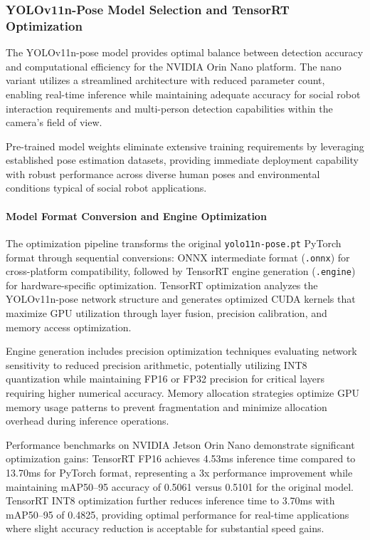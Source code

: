 \subsubsection{YOLOv11n-Pose Model Selection and TensorRT Optimization}

The YOLOv11n-pose model provides optimal balance between detection accuracy and computational efficiency for the NVIDIA Orin Nano platform. The nano variant utilizes a streamlined architecture with reduced parameter count, enabling real-time inference while maintaining adequate accuracy for social robot interaction requirements and multi-person detection capabilities within the camera's field of view.

Pre-trained model weights eliminate extensive training requirements by leveraging established pose estimation datasets, providing immediate deployment capability with robust performance across diverse human poses and environmental conditions typical of social robot applications.

\paragraph{Model Format Conversion and Engine Optimization}

The optimization pipeline transforms the original \texttt{yolo11n-pose.pt} PyTorch format through sequential conversions: ONNX intermediate format (\texttt{.onnx}) for cross-platform compatibility, followed by TensorRT engine generation (\texttt{.engine}) for hardware-specific optimization. TensorRT optimization analyzes the YOLOv11n-pose network structure and generates optimized CUDA kernels that maximize GPU utilization through layer fusion, precision calibration, and memory access optimization.

Engine generation includes precision optimization techniques evaluating network sensitivity to reduced precision arithmetic, potentially utilizing INT8 quantization while maintaining FP16 or FP32 precision for critical layers requiring higher numerical accuracy. Memory allocation strategies optimize GPU memory usage patterns to prevent fragmentation and minimize allocation overhead during inference operations.

Performance benchmarks on NVIDIA Jetson Orin Nano demonstrate significant optimization gains: TensorRT FP16 achieves 4.53ms inference time compared to 13.70ms for PyTorch format, representing a 3x performance improvement while maintaining mAP50--95 accuracy of 0.5061 versus 0.5101 for the original model. TensorRT INT8 optimization further reduces inference time to 3.70ms with mAP50--95 of 0.4825, providing optimal performance for real-time applications where slight accuracy reduction is acceptable for substantial speed gains.

